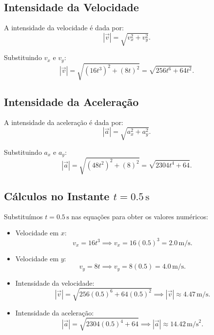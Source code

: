 \subsection*{Intensidade da Velocidade}
A intensidade da velocidade é dada por:
\[
|\vec{v}| = \sqrt{v_x^2 + v_y^2}.
\]

Substituindo \(v_x\) e \(v_y\):
\[
|\vec{v}| = \sqrt{(16t^3)^2 + (8t)^2} = \sqrt{256t^6 + 64t^2}.
\]

\subsection*{Intensidade da Aceleração}
A intensidade da aceleração é dada por:
\[
|\vec{a}| = \sqrt{a_x^2 + a_y^2}.
\]

Substituindo \(a_x\) e \(a_y\):
\[
|\vec{a}| = \sqrt{(48t^2)^2 + (8)^2} = \sqrt{2304t^4 + 64}.
\]

\subsection*{Cálculos no Instante \(t = 0.5 \, \text{s}\)}
Substituímos \(t = 0.5 \, \text{s}\) nas equações para obter os valores numéricos:
\begin{itemize}
    \item Velocidade em \(x\): 
    \[
    v_x = 16t^3 \implies v_x = 16(0.5)^3 = 2.0 \, \text{m/s}.
    \]
    \item Velocidade em \(y\): 
    \[
    v_y = 8t \implies v_y = 8(0.5) = 4.0 \, \text{m/s}.
    \]
    \item Intensidade da velocidade:
    \[
    |\vec{v}| = \sqrt{256(0.5)^6 + 64(0.5)^2} \implies |\vec{v}| \approx 4.47 \, \text{m/s}.
    \]
    \item Intensidade da aceleração:
    \[
    |\vec{a}| = \sqrt{2304(0.5)^4 + 64} \implies |\vec{a}| \approx 14.42 \, \text{m/s}^2.
    \]
\end{itemize}

